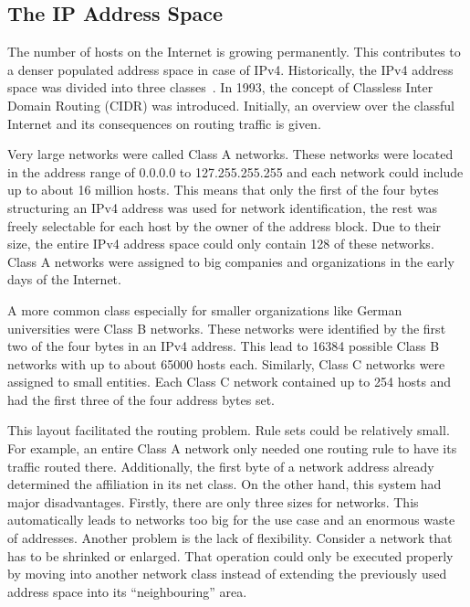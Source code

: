 \documentclass[a4paper,
		12pt,
		parskip=full,
		titlepage
		]{scrartcl}
\begin{document}
\subsection{The IP Address Space}
The number of hosts on the Internet is growing permanently.
This contributes to a denser populated address space in case of IPv4.
Historically, the IPv4 address space was divided into three classes~\cite{rfc1466}.
In 1993, the concept of Classless Inter Domain Routing (CIDR) was introduced.
Initially, an overview over the classful Internet and its consequences on routing traffic is given.

Very large networks were called Class A networks.
These networks were located in the address range of 0.0.0.0 to 127.255.255.255 and each network could include up to about 16 million hosts.
This means that only the first of the four bytes structuring an IPv4 address 
was used for network identification, the rest was freely selectable for each host by the owner of the address block.
Due to their size, the entire IPv4 address space could only contain 128 of these networks.
Class A networks were assigned to big companies and organizations in the early days of the Internet.

A more common class especially for smaller organizations like German universities were Class B networks.
These networks were identified by the first two of the four bytes in an IPv4 address.
This lead to 16384 possible Class B networks with up to about 65000 hosts each.
Similarly, Class C networks were assigned to small entities.
Each Class C network contained up to 254 hosts and had the first three of the four address bytes set.

This layout facilitated the routing problem.
Rule sets could be relatively small.
For example, an entire Class A network only needed one routing rule to have its traffic routed there.
Additionally, the first byte of a network address already determined the affiliation in its net class.
On the other hand, this system had major disadvantages.
Firstly, there are only three sizes for networks.
This automatically leads to networks too big for the use case and an enormous waste of addresses.
Another problem is the lack of flexibility.
Consider a network that has to be shrinked or enlarged.
That operation could only be executed properly by moving into another network class instead of extending the 
previously used address space into its \enquote{neighbouring} area.
\end{document}
